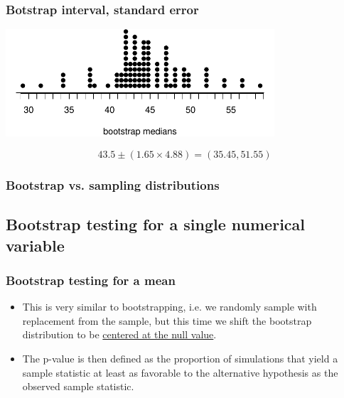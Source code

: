 \documentclass[slidestop,compress,mathserif,12pt,t,professionalfonts,xcolor=table]{beamer}
\newcommand{\soln}[1]{\textit{#1}}
\begin{document}
\begin{frame}
\frametitle{Botstrap interval, standard error}


\begin{center}
\includegraphics[width = 0.75\textwidth]{figures/movies/horror_boot_med_dot}
\end{center}

\pause

\soln{\[ 43.5 \pm (1.65 \times 4.88) = (35.45, 51.55) \] }

\end{frame}


\begin{frame}
\frametitle{Bootstrap vs. sampling distributions}

\vfill


\vfill

\end{frame}


\subsection{Bootstrap testing for a single numerical variable}


\begin{frame}
\frametitle{Bootstrap testing for a mean}

\begin{itemize}

\item This is very similar to bootstrapping, i.e. we randomly sample with replacement from the sample, but this time we shift the bootstrap distribution to be \underline{centered at the null value}. 

\pause

\item The p-value is then defined as the proportion of simulations that yield a sample statistic at least as favorable to the alternative hypothesis as the observed sample statistic.

\end{itemize}

\end{frame}
\end{document}
